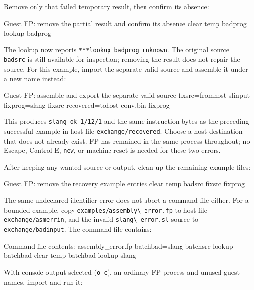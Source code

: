 Remove only that failed temporary result, then confirm its absence:

\begin{commandexample}{Guest FP: remove the partial result and confirm its absence}
clear temp badprog
lookup badprog
\end{commandexample}

The lookup now reports \passthrough{\lstinline!***lookup badprog unknown!}. The original source \passthrough{\lstinline!badsrc!} is still available for inspection; removing the result does not repair the source. For this example, import the separate valid source and assemble it under a new name instead:

\begin{commandexample}{Guest FP: assemble and export the separate valid source}
fixsrc=fromhost slinput
fixprog=slang fixsrc
recovered=tohost conv.bin fixprog
\end{commandexample}

This produces \passthrough{\lstinline!slang ok 1/12/1!} and the same instruction bytes as the preceding successful example in host file \passthrough{\lstinline!exchange/recovered!}. Choose a host destination that does not already exist. FP has remained in the same process throughout; no Escape, Control-E, \passthrough{\lstinline!new!}, or machine reset is needed for these two errors.

After keeping any wanted source or output, clean up the remaining example files:

\begin{commandexample}{Guest FP: remove the recovery example entries}
clear temp badsrc fixsrc fixprog
\end{commandexample}

The same undeclared-identifier error does not abort a command file either. For a bounded example, copy \passthrough{\lstinline!examples/assembly\_error.fp!} to host file \passthrough{\lstinline!exchange/asmerrin!}, and the invalid \passthrough{\lstinline!slang\_error.sl!} source to \passthrough{\lstinline!exchange/badinput!}. The command file contains:

\begin{commandexample}{Command-file contents: assembly\_error.fp}
batchbad=slang batchsrc
lookup batchbad
clear temp batchbad
lookup slang
\end{commandexample}

With console output selected (\passthrough{\lstinline!o c!}), an ordinary FP process and unused guest names, import and run it:

